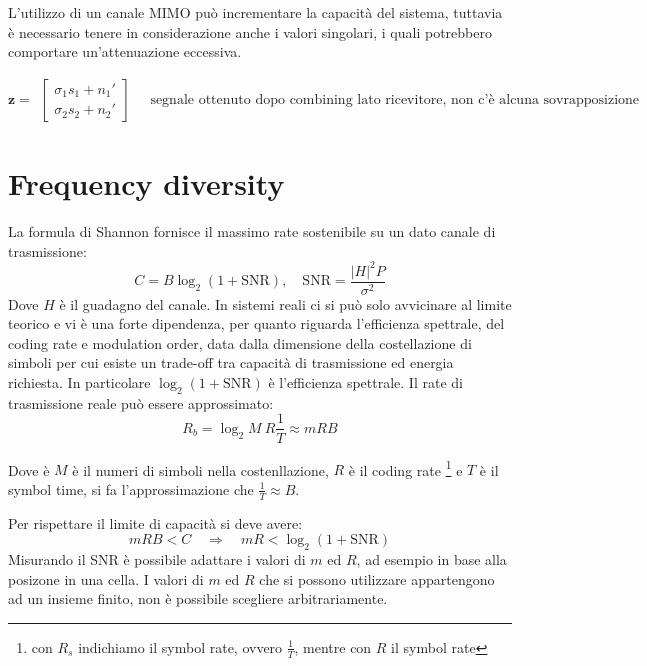 L'utilizzo di un canale MIMO può incrementare la capacità del sistema, tuttavia è necessario tenere in considerazione anche i valori singolari, i quali potrebbero comportare un'attenuazione eccessiva.


\[
    \mathbf{z} = \begin{matrix}
        \begin{bmatrix}
            \sigma_1 s_1 + n_1' \\
            \sigma_2 s_2 + n_2'
        \end{bmatrix}
    \end{matrix}
    \quad 
    \text{segnale ottenuto dopo combining lato ricevitore, non c'è alcuna sovrapposizione}
\]




\section*{Frequency diversity}

La formula di Shannon fornisce il massimo rate sostenibile su un dato canale di trasmissione:
\[
    C = B \log_2 \left( 1 + \text{SNR} \right), \quad \text{SNR} = \frac{\left| H \right|^2 P}{\sigma^2}
\]
Dove $H$ è il guadagno del canale.
In sistemi reali ci si può solo avvicinare al limite teorico e vi è una forte dipendenza, per quanto riguarda l'efficienza spettrale, del coding rate e modulation order, data dalla dimensione della costellazione di simboli per cui esiste un trade-off tra capacità di trasmissione ed energia richiesta.
In particolare $\log_2 \left( 1 + \text{SNR} \right)$ è l'efficienza spettrale.
Il rate di trasmissione reale può essere approssimato:
\[
    R_b = \log_2 M \  R \frac{1}{T}  \approx m R B
\]

Dove è $M$ è il numeri di simboli nella costenllazione, $R$ è il coding rate \footnote{con $R_s$ indichiamo il symbol rate, ovvero $\frac{1}{T}$, mentre con $R$ il symbol rate} e $T$ è il symbol time, si fa l'approssimazione che $\frac{1}{T} \approx B$. 


Per rispettare il limite di capacità si deve avere:
\[
    m R B < C \quad \Rightarrow \quad m R < \log_2 (1 + \text{SNR})
\]
Misurando il SNR è possibile adattare i valori di $m$ ed $R$, ad esempio in base alla posizone in una cella.
I valori di $m$ ed $R$ che si possono utilizzare appartengono ad un insieme finito, non è possibile scegliere arbitrariamente.

